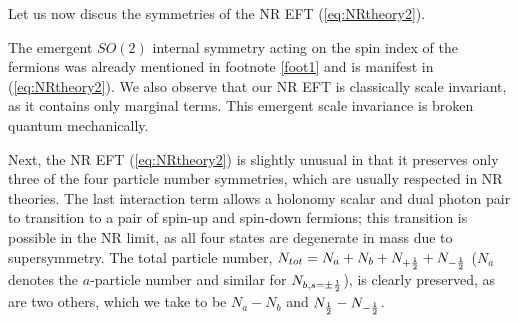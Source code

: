 \documentclass[11pt]{article}
\begin{document}
 Let us now discus the symmetries of the NR EFT (\ref{eq:NRtheory2}).
 
 The emergent $SO(2)$ internal symmetry acting on the spin index of the fermions was already mentioned in footnote \ref{foot1} and is manifest in (\ref{eq:NRtheory2}). 
We also observe that our NR EFT is classically scale invariant, as it contains only marginal terms. This emergent scale invariance is broken quantum mechanically.%

Next,  the NR EFT (\ref{eq:NRtheory2}) is slightly unusual in that it preserves only three of the four particle number symmetries, which are usually respected in NR theories. The last interaction term allows a   holonomy scalar and dual photon pair to transition to a pair of spin-up and spin-down fermions; this transition is possible in the NR limit, as all four states are degenerate in mass due to supersymmetry.
The total particle number, $N_{tot} = N_a + N_b + N_{+{1\over 2}} + N_{-{1\over 2}}$ ($N_a$  denotes  the $a$-particle number and similar for $N_{b, s=\pm {1 \over 2}}$), is clearly preserved, as are two others, which we  take to be $N_a - N_b$ and $N_{{1\over 2}} - N_{- {1\over 2}}$.
  
\end{document}
